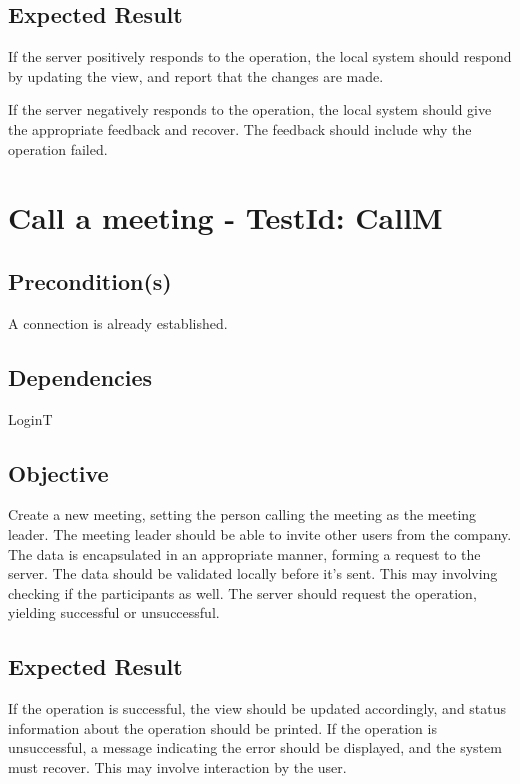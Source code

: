 \documentclass{article}
\begin{document}
\subsection{Expected Result}

If the server positively responds to the operation, the local system should
respond by updating the view, and report that the changes are made.

If the server negatively responds to the operation, the local system should
give the appropriate feedback and recover. The feedback should include why
the operation failed. \newpage

\section{Call a meeting - TestId: CallM}

\subsection{Precondition(s)}

A connection is already established.

\subsection{Dependencies}

LoginT

\subsection{Objective}

Create a new meeting, setting the person calling the meeting as the meeting
leader. The meeting leader should be able to invite other users from the
company. The data is encapsulated in an appropriate manner, forming a
request to the server. The data should be validated locally before it's
sent. This may involving checking if the participants as well. The server
should request the operation, yielding successful or unsuccessful.

\subsection{Expected Result}

If the operation is successful, the view should be updated accordingly, and
status information about the operation should be printed. \bigskip If the
operation is unsuccessful, a message indicating the error should be
displayed, and the system must recover. This may involve interaction by the
user. \newpage
\end{document}
